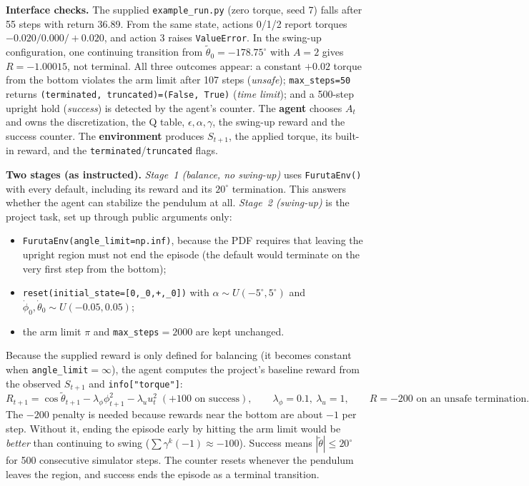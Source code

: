 \documentclass[11pt]{article}
\newcommand{\thw}{\tilde\theta}
\begin{document}
\textbf{Interface checks.} The supplied \texttt{example\_run.py} (zero torque, seed 7) falls
after 55 steps with return 36.89. From the same state, actions 0/1/2 report torques
$-0.020/0.000/+0.020$, and action 3 raises \texttt{ValueError}. In the swing-up configuration,
one continuing transition from $\thw_0=-178.75^\circ$ with $A=2$ gives $R=-1.00015$, not
terminal. All three outcomes appear: a constant $+0.02$ torque from the bottom violates the
arm limit after 107 steps (\emph{unsafe}); \texttt{max\_steps=50} returns
\texttt{(terminated, truncated)=(False, True)} (\emph{time limit}); and a 500-step upright hold
(\emph{success}) is detected by the agent's counter. The \textbf{agent} chooses $A_t$ and owns the
discretization, the Q table, $\epsilon,\alpha,\gamma$, the swing-up reward and the success counter. The
\textbf{environment} produces $S_{t+1}$, the applied torque, its built-in reward, and the
\texttt{terminated}/\texttt{truncated} flags.

\textbf{Two stages (as instructed).} \emph{Stage~1 (balance, no swing-up)} uses
\texttt{FurutaEnv()} with every default, including its reward and its $20^\circ$ termination. This
answers whether the agent can stabilize the pendulum at all. \emph{Stage~2 (swing-up)} is the
project task, set up through public arguments only:
\begin{itemize}
\item \texttt{FurutaEnv(angle\_limit=np.inf)}, because the PDF requires that leaving the upright
region must not end the episode (the default would terminate on the very first step from
the bottom);
\item \texttt{reset(initial\_state=[0,\dot\phi_0,\pi+\alpha,\dot\theta_0])} with
$\alpha\sim U(-5^\circ,5^\circ)$ and $\dot\phi_0,\dot\theta_0\sim U(-0.05,0.05)$;
\item the arm limit $\pi$ and \texttt{max\_steps}$=2000$ are kept unchanged.
\end{itemize}
Because the supplied reward is only defined for balancing (it becomes constant when
\texttt{angle\_limit}$=\infty$), the agent computes the project's baseline reward from the observed
$S_{t+1}$ and \texttt{info["torque"]}:
\[
R_{t+1}=\cos\thw_{t+1}-\lambda_\phi\phi_{t+1}^2-\lambda_u u_t^2\;(+100\text{ on success}),\qquad
\lambda_\phi=0.1,\ \lambda_u=1,\qquad R=-200\text{ on an unsafe termination}.
\]
The $-200$ penalty is needed because rewards near the bottom are about $-1$ per step. Without it,
ending the episode early by hitting the arm limit would be \emph{better} than continuing to swing
($\sum\gamma^k(-1)\approx-100$). Success means $|\thw|\le 20^\circ$ for 500 consecutive simulator
steps. The counter resets whenever the pendulum leaves the region, and success ends the episode
as a terminal transition.
\end{document}
